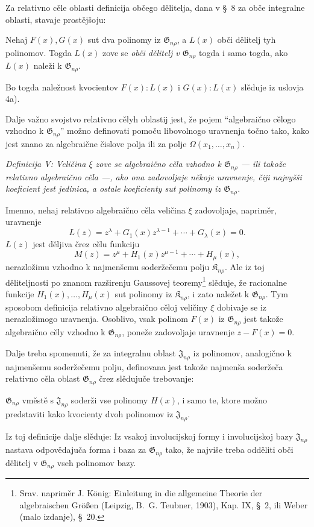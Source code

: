 \documentclass[11pt]{article}
\providecommand{\Kfield}{\mathfrak{K}}
\providecommand{\Jdom}{\mathfrak{J}}
\providecommand{\Gdom}{\mathfrak{G}}
\begin{document}
Za relativno cěle oblasti definicija občego dělitelja, dana v \S\ 8 za obče integralne oblasti, stavaje prostějšoju:

Nehaj $F(x),G(x)$ sut dva polinomy iz $\Gdom_{n\rho}$, a $L(x)$ obči dělitelj tyh polinomov. Togda $L(x)$ zove se \emph{obči dělitelj v $\Gdom_{n\rho}$} togda i samo togda, ako $L(x)$ naleži k $\Gdom_{n\rho}$.

Bo togda naležnost kvocientov $F(x):L(x)$ i $G(x):L(x)$ slěduje iz uslovja 4a).

Dalje važno svojstvo relativno cělyh oblastij jest, že pojem ``algebraično cělogo vzhodno k $\Gdom_{n\rho}$'' možno definovati pomoču libovolnogo uravnenja točno tako, kako jest znano za algebraične čislove polja ili za polje $\Omega(x_1,\ldots,x_n)$.

{\itshape Definicija V: Veličina $\xi$ zove se algebraično cěla vzhodno k $\Gdom_{n\rho}$ --- ili takože relativno algebraično cěla ---, ako ona zadovoljaje někoje uravnenje, čiji najvyšši koeficient jest jedinica, a ostale koeficienty sut polinomy iz $\Gdom_{n\rho}$.}

Imenno, nehaj relativno algebraično cěla veličina $\xi$ zadovoljaje, napriměr, uravnenje
\[
  L(z)=z^\lambda+G_1(x)z^{\lambda-1}+\cdots+G_\lambda(x)=0.
\]
$L(z)$ jest děljiva črez cělu funkciju
\[
  M(z)=z^\mu+H_1(x)z^{\mu-1}+\cdots+H_\mu(x),
\]
nerazložimu vzhodno k najmenšemu soderžečemu polju $\Kfield_{n\rho}$. Ale iz toj děliteljnosti po znanom razširenju Gaussovej teoremy\footnote{Srav. napriměr J. König: Einleitung in die allgemeine Theorie der algebraischen Größen (Leipzig, B.~G. Teubner, 1903), Kap. IX, \S\ 2, ili Weber (malo izdanje), \S\ 20.} slěduje, že racionalne funkcije $H_1(x),\ldots,H_\mu(x)$ sut polinomy iz $\Kfield_{n\rho}$, i zato naležet k $\Gdom_{n\rho}$. Tym sposobom definicija relativno algebraično cěloj veličiny $\xi$ dobivaje se iz nerazložimogo uravnenja. Osoblivo, vsak polinom $F(x)$ iz $\Gdom_{n\rho}$ jest takože algebraično cěly vzhodno k $\Gdom_{n\rho}$, poneže zadovoljaje uravnenje $z-F(x)=0$.

Dalje treba spomenuti, že za integralnu oblast $\Jdom_{n\rho}$ iz polinomov, analogično k najmenšemu soderžečemu polju, definovana jest takože najmenša soderžeča relativno cěla oblast $\Gdom_{n\rho}$ črez slědujuče trebovanje:

$\Gdom_{n\rho}$ vměstě s $\Jdom_{n\rho}$ soderži vse polinomy $H(x)$, i samo te, ktore možno predstaviti kako kvocienty dvoh polinomov iz $\Jdom_{n\rho}$.

Iz toj definicije dalje slěduje: Iz vsakoj involucijskoj formy i involucijskoj bazy $\Jdom_{n\rho}$ nastava odpovědajuča forma i baza za $\Gdom_{n\rho}$ tako, že najviše treba odděliti obči dělitelj v $\Gdom_{n\rho}$ vseh polinomov bazy.
\end{document}
